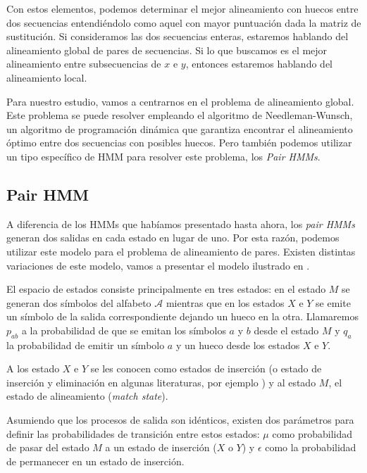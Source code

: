 Con estos elementos, podemos determinar el mejor alineamiento con huecos entre dos secuencias entendiéndolo como aquel con mayor puntuación dada la matriz de sustitución. Si consideramos las dos secuencias enteras, estaremos hablando del alineamiento global de pares de secuencias. Si lo que buscamos es el mejor alineamiento entre subsecuencias de $x$ e $y$, entonces estaremos hablando del alineamiento local.

Para nuestro estudio, vamos a centrarnos en el problema de alineamiento global. Este problema se puede resolver empleando el algoritmo de Needleman-Wunsch, un algoritmo de programación dinámica que garantiza encontrar el alineamiento óptimo entre dos secuencias con posibles huecos. Pero también podemos utilizar un tipo específico de HMM para resolver este problema, los \textit{Pair HMMs}.

\subsection{Pair HMM}
A diferencia de los HMMs que habíamos presentado hasta ahora, los \textit{pair HMMs} generan dos salidas en cada estado en lugar de uno. Por esta razón, podemos utilizar este modelo para el problema de alineamiento de pares. Existen distintas variaciones de este modelo, vamos a presentar el modelo ilustrado en \cite{Durbin}. 


El espacio de estados consiste principalmente en tres estados: en el estado $M$ se generan dos símbolos del alfabeto $\mathcal{A}$ mientras que en los estados $X$ e $Y$ se emite un símbolo de la salida correspondiente dejando un hueco en la otra. Llamaremos $p_{ab}$ a la probabilidad de que se emitan los símbolos $a$ y $b$ desde el estado $M$ y $q_{a}$ la probabilidad de emitir un símbolo $a$ y un hueco desde los estados $X$ e $Y$.

A los estado $X$ e $Y$ se les conocen como estados de inserción (o estado de inserción y eliminación en algunas literaturas, por ejemplo \cite{Marina}) y al estado $M$, el estado de alineamiento (\textit{match state}). 


Asumiendo que los procesos de salida son idénticos, existen dos parámetros para definir las probabilidades de transición entre estos estados: $\mu$ como probabilidad de pasar del estado $M$ a un estado de inserción ($X$ o $Y$) y $\epsilon$ como la probabilidad de permanecer en un estado de inserción.

